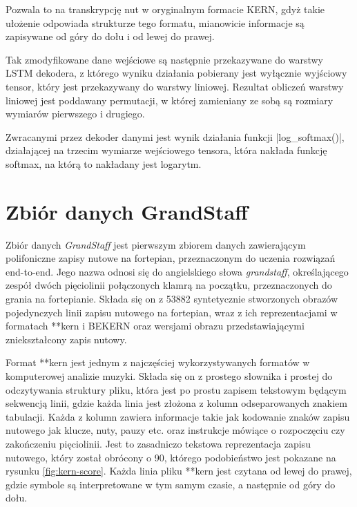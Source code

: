 Pozwala to na transkrypcję nut w oryginalnym formacie KERN, gdyż takie ułożenie odpowiada strukturze tego formatu, mianowicie informacje są zapisywane od góry do dołu i od lewej do prawej.

Tak zmodyfikowane dane wejściowe są następnie przekazywane do warstwy LSTM dekodera, z którego wyniku działania pobierany jest wyłącznie wyjściowy tensor, który jest przekazywany do warstwy liniowej. Rezultat obliczeń warstwy liniowej jest poddawany permutacji, w której zamieniany ze sobą są rozmiary wymiarów pierwszego i drugiego.

Zwracanymi przez dekoder danymi jest wynik działania funkcji \pyth|log_softmax()|, działającej na trzecim wymiarze wejściowego tensora, która nakłada funkcję softmax, na którą to nakładany jest logarytm.

\section{Zbiór danych GrandStaff}

Zbiór danych \textit{GrandStaff} jest pierwszym zbiorem danych zawierającym polifoniczne zapisy nutowe na fortepian, przeznaczonym do uczenia rozwiązań end-to-end. Jego nazwa odnosi się do angielskiego słowa \textit{grandstaff}, określającego zespół dwóch pięciolinii połączonych klamrą na początku, przeznaczonych do grania na fortepianie.
Składa się on z 53882 syntetycznie stworzonych obrazów pojedynczych linii zapisu nutowego na fortepian, wraz z ich reprezentacjami w formatach **kern i BEKERN oraz wersjami obrazu przedstawiającymi zniekształcony zapis nutowy.

Format **kern jest jednym z najczęściej wykorzystywanych formatów w komputerowej analizie muzyki. Składa się on z prostego słownika i prostej do odczytywania struktury pliku, która jest po prostu zapisem tekstowym będącym sekwencją linii, gdzie każda linia jest złożona z kolumn odseparowanych znakiem tabulacji. Każda z kolumn zawiera informacje takie jak kodowanie znaków zapisu nutowego jak klucze, nuty, pauzy etc. oraz instrukcje mówiące o rozpoczęciu czy zakończeniu pięciolinii. Jest to zasadniczo tekstowa reprezentacja zapisu nutowego, który został obrócony o 90\degree, którego podobieństwo jest pokazane na rysunku \ref{fig:kern-score}. Każda linia pliku **kern jest czytana od lewej do prawej, gdzie symbole są interpretowane w tym samym czasie, a następnie od góry do dołu.

